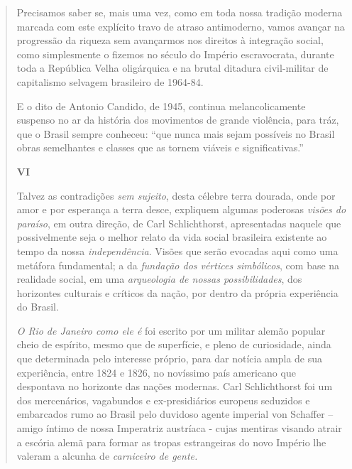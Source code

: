 \begin{quote}
Precisamos saber se, mais uma vez, como em toda nossa tradição moderna
marcada com este explícito travo de atraso antimoderno, vamos avançar na
progressão da riqueza sem avançarmos nos direitos à integração social,
como simplesmente o fizemos no século do Império escravocrata, durante
toda a República Velha oligárquica e na brutal ditadura civil-militar de
capitalismo selvagem brasileiro de 1964-84.

E o dito de Antonio Candido, de 1945, continua melancolicamente suspenso
no ar da história dos movimentos de grande violência, para tráz, que o
Brasil sempre conheceu: ``que nunca mais sejam possíveis no Brasil obras
semelhantes e classes que as tornem viáveis e significativas.''

\textbf{VI}

Talvez as contradições \emph{sem sujeito}, desta célebre terra dourada,
onde por amor e por esperança a terra desce, expliquem algumas poderosas
\emph{visões do paraíso}, em outra direção, de Carl Schlichthorst,
apresentadas naquele que possivelmente seja o melhor relato da vida
social brasileira existente ao tempo da nossa \emph{independência}.
Visões que serão evocadas aqui como uma metáfora fundamental; a da
\emph{fundação dos vértices simbólicos}, com base na realidade social,
em uma \emph{arqueologia de nossas possibilidades}, dos horizontes
culturais e críticos da nação, por dentro da própria experiência do
Brasil.

\emph{O Rio de Janeiro como ele é} foi escrito por um militar alemão
popular cheio de espírito, mesmo que de superfície, e pleno de
curiosidade, ainda que determinada pelo interesse próprio, para dar
notícia ampla de sua experiência, entre 1824 e 1826, no novíssimo país
americano que despontava no horizonte das nações modernas. Carl
Schlichthorst foi um dos mercenários, vagabundos e ex-presidiários
europeus seduzidos e embarcados rumo ao Brasil pelo duvidoso agente
imperial von Schaffer -- amigo íntimo de nossa Imperatriz austríaca -
cujas mentiras visando atrair a escória alemã para formar as tropas
estrangeiras do novo Império lhe valeram a alcunha de \emph{carniceiro
de gente.}


\end{quote}
